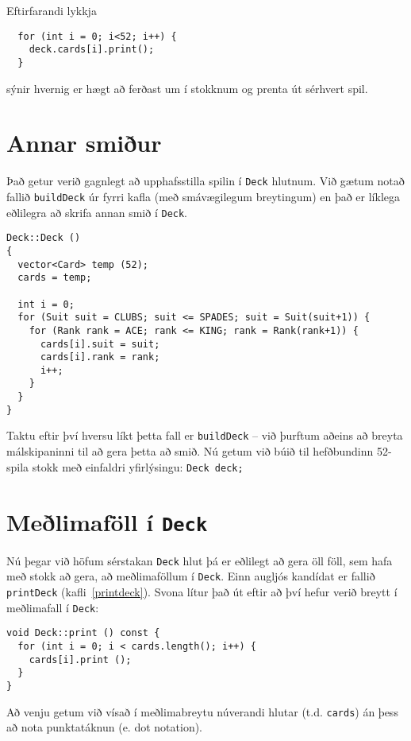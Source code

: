 Eftirfarandi lykkja

\begin{verbatim}
  for (int i = 0; i<52; i++) {
    deck.cards[i].print();
  }
\end{verbatim}
%
sýnir hvernig er hægt að ferðast um í stokknum og prenta út sérhvert spil.

\section {Annar smiður}

Það getur verið gagnlegt að upphafsstilla spilin í {\tt Deck} hlutnum.
Við gætum notað fallið {\tt buildDeck} úr fyrri kafla (með smávægilegum breytingum) 
en það er líklega eðlilegra að skrifa annan smið í {\tt Deck}.


\begin{verbatim}
Deck::Deck ()
{
  vector<Card> temp (52);
  cards = temp;

  int i = 0;
  for (Suit suit = CLUBS; suit <= SPADES; suit = Suit(suit+1)) {
    for (Rank rank = ACE; rank <= KING; rank = Rank(rank+1)) {
      cards[i].suit = suit;
      cards[i].rank = rank;
      i++;
    }
  }
}
\end{verbatim}
%
Taktu eftir því hversu líkt þetta fall er {\tt buildDeck} -- við þurftum aðeins að breyta málskipaninni til að gera þetta að smið.
Nú getum við búið til hefðbundinn 52-spila stokk með einfaldri yfirlýsingu: {\tt Deck deck;}

\section {Meðlimaföll í {\tt Deck}}

Nú þegar við höfum sérstakan {\tt Deck} hlut þá er eðlilegt að gera öll föll, sem hafa með stokk að gera, að
meðlimaföllum í {\tt Deck}.
Einn augljós kandídat er fallið {\tt printDeck} (kafli~\ref{printdeck}).
Svona lítur það út eftir að því hefur verið breytt í meðlimafall í {\tt Deck}:


\begin{verbatim}
void Deck::print () const {
  for (int i = 0; i < cards.length(); i++) {
    cards[i].print ();
  }
}
\end{verbatim}
%
Að venju getum við vísað í meðlimabreytu núverandi hlutar (t.d. {\tt cards}) án þess að nota punktatáknun (e. dot notation).

